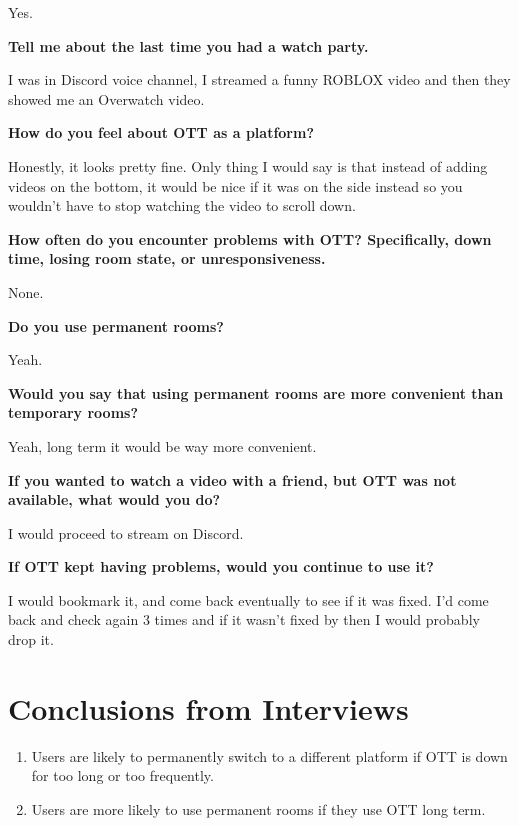 Yes.

\textbf{Tell me about the last time you had a watch party.}

I was in Discord voice channel, I streamed a funny ROBLOX video and then they showed me an Overwatch video.

\textbf{How do you feel about OTT as a platform?}

Honestly, it looks pretty fine. Only thing I would say is that instead of adding videos on the bottom, it would be nice if it was on the side instead so you wouldn't have to stop watching the video to scroll down.

\textbf{How often do you encounter problems with OTT? Specifically, down time, losing room state, or unresponsiveness.}

None.

\textbf{Do you use permanent rooms?}

Yeah.

\textbf{Would you say that using permanent rooms are more convenient than temporary rooms?}

Yeah, long term it would be way more convenient.

\textbf{If you wanted to watch a video with a friend, but OTT was not available, what would you do?}

I would proceed to stream on Discord.

\textbf{If OTT kept having problems, would you continue to use it?}

I would bookmark it, and come back eventually to see if it was fixed. I'd come back and check again 3 times and if it wasn't fixed by then I would probably drop it.

\section{Conclusions from Interviews}

\begin{enumerate}
	\item Users are likely to permanently switch to a different platform if OTT is down for too long or too frequently.
	\item Users are more likely to use permanent rooms if they use OTT long term.
\end{enumerate}